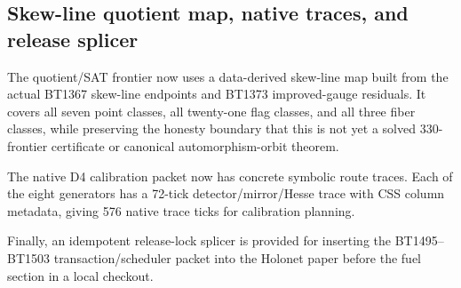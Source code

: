 \subsection{Skew-line quotient map, native traces, and release splicer}
\label{sec:bt1504-bt1506-orbit-traces-splicer}

The quotient/SAT frontier now uses a data-derived skew-line map built from the actual BT1367 skew-line endpoints and BT1373 improved-gauge residuals.  It covers all seven point classes, all twenty-one flag classes, and all three fiber classes, while preserving the honesty boundary that this is not yet a solved 330-frontier certificate or canonical automorphism-orbit theorem.

The native D4 calibration packet now has concrete symbolic route traces.  Each of the eight generators has a 72-tick detector/mirror/Hesse trace with CSS column metadata, giving 576 native trace ticks for calibration planning.

Finally, an idempotent release-lock splicer is provided for inserting the BT1495--BT1503 transaction/scheduler packet into the Holonet paper before the fuel section in a local checkout.
